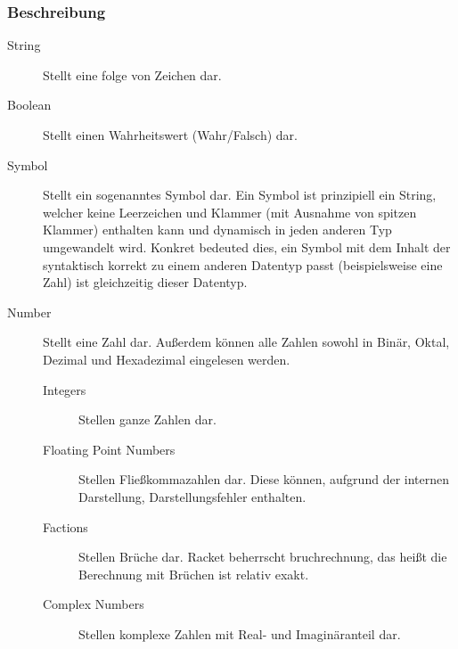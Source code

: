 			\subsubsection{Beschreibung}
				\begin{description}
					\item[String] Stellt eine folge von Zeichen dar.
					\item[Boolean] Stellt einen Wahrheitswert (Wahr/Falsch) dar.
					\item[Symbol] Stellt ein sogenanntes Symbol dar. Ein Symbol ist prinzipiell ein String, welcher keine Leerzeichen und Klammer (mit Ausnahme von spitzen Klammer) enthalten kann und dynamisch in jeden anderen Typ umgewandelt wird. Konkret bedeuted dies, ein Symbol mit dem Inhalt der syntaktisch korrekt zu einem anderen Datentyp passt (beispielsweise eine Zahl) ist gleichzeitig dieser Datentyp.
					\item[Number] Stellt eine Zahl dar. Außerdem können alle Zahlen sowohl in Binär, Oktal, Dezimal und Hexadezimal eingelesen werden.
						\begin{description}
							\item[Integers] Stellen ganze Zahlen dar.
							\item[Floating Point Numbers] Stellen Fließkommazahlen dar. Diese können, aufgrund der internen Darstellung, Darstellungsfehler enthalten.
							\item[Factions] Stellen Brüche dar. Racket beherrscht bruchrechnung, das heißt die Berechnung mit Brüchen ist relativ exakt.
							\item[Complex Numbers] Stellen komplexe Zahlen mit Real- und Imaginäranteil dar.
						\end{description}
				\end{description}


